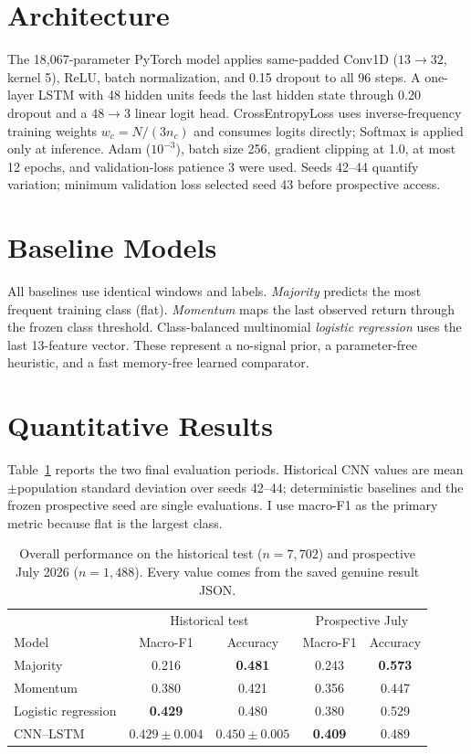 \documentclass[final]{article}
\begin{document}
\section{Architecture}
The 18,067-parameter PyTorch model applies same-padded Conv1D ($13\rightarrow32$, kernel 5), ReLU,
batch normalization, and 0.15 dropout to all 96 steps. A one-layer LSTM with 48 hidden units feeds
the last hidden state through 0.20 dropout and a $48\rightarrow3$ linear logit head. CrossEntropyLoss
uses inverse-frequency training weights $w_c=N/(3n_c)$ and consumes logits directly; Softmax is
applied only at inference. Adam ($10^{-3}$), batch size 256, gradient clipping at 1.0, at most 12
epochs, and validation-loss patience 3 were used. Seeds 42--44 quantify variation; minimum validation
loss selected seed 43 before prospective access.

\section{Baseline Models}
All baselines use identical windows and labels. \emph{Majority} predicts the most frequent training
class (flat). \emph{Momentum} maps the last observed return through the frozen class threshold.
Class-balanced multinomial \emph{logistic regression} uses the last 13-feature vector. These represent
a no-signal prior, a parameter-free heuristic, and a fast memory-free learned comparator.

\newpage
\section{Quantitative Results}
Table~\ref{tab:overall} reports the two final evaluation periods. Historical CNN values are
mean$\pm$population standard deviation over seeds 42--44; deterministic baselines and the frozen
prospective seed are single evaluations. I use macro-F1 as the primary metric because flat is the
largest class.

\begin{table}[!h]
\centering
\footnotesize
\caption{Overall performance on the historical test ($n=7{,}702$) and prospective July 2026
($n=1{,}488$). Every value comes from the saved genuine result JSON.}
\label{tab:overall}
\begin{tabular}{lcccc}
\toprule
& \multicolumn{2}{c}{Historical test} & \multicolumn{2}{c}{Prospective July}\\
Model & Macro-F1 & Accuracy & Macro-F1 & Accuracy\\
\midrule
Majority & 0.216 & \textbf{0.481} & 0.243 & \textbf{0.573}\\
Momentum & 0.380 & 0.421 & 0.356 & 0.447\\
Logistic regression & \textbf{0.429} & 0.480 & 0.380 & 0.529\\
CNN--LSTM & $0.429\pm0.004$ & $0.450\pm0.005$ & \textbf{0.409} & 0.489\\
\bottomrule
\end{tabular}
\end{table}
\end{document}
